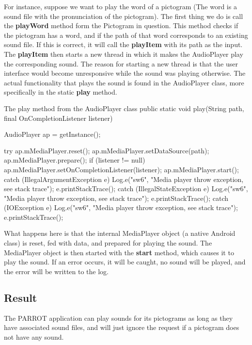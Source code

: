 For instance, suppose we want to play the word of a pictogram (The word is a sound file with the pronunciation of the pictogram). 
The first thing we do is call the \textbf{playWord} method form the Pictogram in question. 
This method checks if the pictogram has a word, and if the path of that word corresponds to an existing sound file. 
If this is correct, it will call the \textbf{playItem} with its path as the input.\newline 
The \textbf{playItem} then starts a new thread in which it makes the AudioPlayer play the corresponding sound. 
The reason for starting a new thread is that the user interface would become unresponsive while the sound was playing otherwise.\newline
The actual functionality that plays the sound is found in the AudioPlayer class, more specifically  in the static \textbf{play} method.

\begin{source}[{audioplay}]{The play method from the AudioPlayer class}
	public static void play(String path, final OnCompletionListener listener)
	{
		AudioPlayer ap = getInstance();
		 
		try {
			ap.mMediaPlayer.reset();
			ap.mMediaPlayer.setDataSource(path);
			ap.mMediaPlayer.prepare();
			if (listener != null)
				ap.mMediaPlayer.setOnCompletionListener(listener);
			ap.mMediaPlayer.start(); 
		} catch (IllegalArgumentException e) {
			Log.e("sw6", "Media player throw exception, see stack trace");
			e.printStackTrace();
		} catch (IllegalStateException e) {
			Log.e("sw6", "Media player throw exception, see stack trace");
			e.printStackTrace();
		} catch (IOException e) {
			Log.e("sw6", "Media player throw exception, see stack trace");
			e.printStackTrace();
		} 
	}
\end{source}

What happens here is that the internal MediaPlayer object (a native Android class) is reset, fed with data, and prepared for playing the sound. The MediaPlayer object is then started with the \textbf{start} method, which causes it to play the sound. If an error occurs, it will be caught, no sound will be played, and the error will be written to the log.

\subsection*{Result}
The PARROT application can play sounds for its pictograms as long as they have associated sound files, and will just ignore the request if a pictogram does not have any sound.


